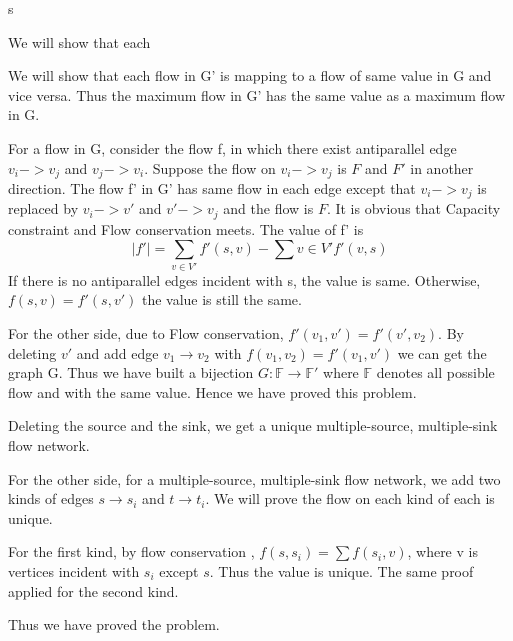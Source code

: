 s\pshw
\begin{psproblem}[26.1.1]
    We will show that each
\end{psproblem}
\begin{pssolution}
    We will show that each flow in G' is mapping to a flow of same value in G and vice versa. Thus the maximum flow in G' has the same value as a maximum flow in G.

    For a flow in G, consider the flow f, in which there exist antiparallel edge $v_i->v_j$ and $v_j->v_i$. Suppose the flow on $v_i->v_j$ is $F$ and $F'$ in another direction. The flow f' in G' has same flow in each edge except that $v_i->v_j$ is replaced by $v_i->v'$ and $v'->v_j$ and the flow is $F$. It is obvious that Capacity constraint and Flow conservation meets. The value of f' is 
        $$|f'|=\sum_{v\in V'}f'(s,v)-\sum{v\in V'}f'(v,s)$$ 
    If there is no antiparallel edges incident with s, the value is same. Otherwise, $f(s,v)=f'(s,v')$ the value is still the same.

    For the other side, due to Flow conservation, $f'(v_1,v')=f'(v',v_2)$. By deleting $v'$ and add edge $v_1\rightarrow v_2$ with $f(v_1,v_2)=f'(v_1,v')$ we can get the graph G. Thus we have built a bijection $G:\mathbb{F}\rightarrow\mathbb{F'}$ where $\mathbb{F}$ denotes all possible flow and with the same value. Hence we have proved this problem.
\end{pssolution}

\begin{psproblem}[26.1.2]
\end{psproblem}
\begin{pssolution}
    Deleting the source and the sink, we get a unique multiple-source, multiple-sink flow network.

    For the other side, for a multiple-source, multiple-sink flow network, we add two kinds of edges $s\rightarrow s_i$ and $t\rightarrow t_i$. We will prove the flow on each kind of each is unique.
    
    For the first kind, by flow conservation , $f(s, s_i)=\sum f(s_i, v)$, where v is vertices incident with $s_i$ except $s$. Thus the value is unique. The same proof applied for the second kind.

    Thus we have proved the problem.
\end{pssolution}

